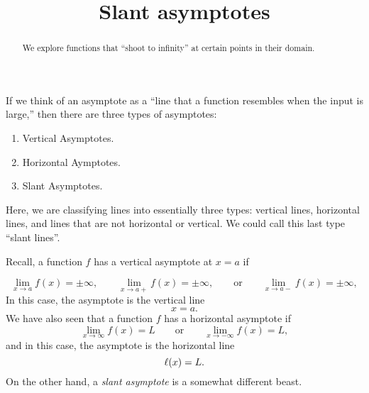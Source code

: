 \documentclass{ximera}
\title[Dig-In:]{Slant asymptotes}
\begin{document}
\begin{abstract}
We explore functions that ``shoot to infinity'' at certain points in
their domain.
\end{abstract}
\maketitle

If we think of an asymptote as a ``line that a function resembles
when the input is large,'' then there are three types of asymptotes:
\begin{enumerate}
\item Vertical Asymptotes.
\item Horizontal Aymptotes.
\item Slant Asymptotes.
\end{enumerate}

Here, we are classifying lines into essentially three types: vertical lines, 
horizontal lines, and lines that are not horizontal or vertical.  We could 
call this last type ``slant lines''.

Recall, a function $f$ has a vertical asymptote at $x=a$ if

\[
\lim_{x\to a} f(x) = \pm\infty, \qquad \lim_{x\to a+} f(x) = \pm\infty, \qquad\text{or}\qquad \lim_{x\to a-} f(x) = \pm\infty,
\]
In this case, the asymptote is the vertical line
\[
x = a.
\]
We have also seen that a function $f$ has a horizontal asymptote if
\[
\lim_{x\to \infty} f(x) = L \qquad\text{or}\qquad \lim_{x\to -\infty}
f(x) = L,
\]
and in this case, the asymptote is the horizontal line
\[
\ell(x) = L.
\]
On the other hand, a \textit{slant asymptote} is a somewhat different
beast.
\end{document}
